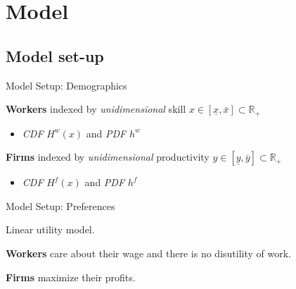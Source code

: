 \documentclass[notes,11pt, aspectratio=169]{beamer}
\newenvironment{wideitemize}{\itemize\addtolength{\itemsep}{10pt}}{\enditemize}
\begin{document}
\section{Model}

\subsection{Model set-up}
\begin{frame}{Model Setup: Demographics}

	\begin{wideitemize}
		\item  \textbf{Workers} indexed by \textit{unidimensional} skill $x\in[\underline{x},  \bar{x} ]\subset \mathbb{R}_+$
		\begin{itemize}
			\item  \textit{CDF} $H^w(x)$ and \textit{PDF} $h^w$  
		\end{itemize}
		\item  \textbf{Firms} indexed by \textit{unidimensional} productivity $y\in[\underline{y},  \bar{y} ]\subset \mathbb{R}_+$
    \begin{itemize}
        \item \textit{CDF} $H^f(x)$ and \textit{PDF} $h^f$  
    \end{itemize}
\end{wideitemize}
\end{frame}

\begin{frame}{Model Setup: Preferences}

	
	\begin{wideitemize}
		\item Linear utility model.
		\item \textbf{Workers} care about their wage and there is no disutility of work.
		\item  \textbf{Firms} maximize their profits.
	\end{wideitemize}

\end{frame}
\end{document}
